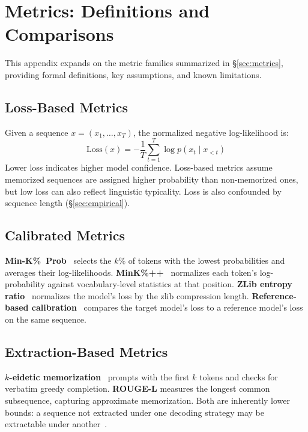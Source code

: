 \documentclass[11pt]{article}
\begin{document}
\section{Metrics: Definitions and Comparisons}
\label{app:metrics}

This appendix expands on the metric families summarized in \S\ref{sec:metrics},
providing formal definitions, key assumptions, and known limitations.

\subsection{Loss-Based Metrics}

Given a sequence $x = (x_1, \ldots, x_T)$, the normalized negative log-likelihood is:
\begin{equation}
\text{Loss}(x) = -\frac{1}{T} \sum_{t=1}^{T} \log p(x_t \mid x_{<t})
\end{equation}
Lower loss indicates higher model confidence.
Loss-based metrics assume memorized sequences are assigned higher probability
than non-memorized ones, but low loss can also reflect linguistic typicality.
Loss is also confounded by sequence length (\S\ref{sec:empirical}).

\subsection{Calibrated Metrics}

\textbf{Min-K\%~Prob}~\citep{shi2023detecting} selects the $k$\% of tokens
with the lowest probabilities and averages their log-likelihoods.
\textbf{MinK\%++}~\citep{zhang2025minkpp} normalizes each token's
log-probability against vocabulary-level statistics at that position.
\textbf{ZLib entropy ratio}~\citep{carlini2021extractingtrainingdatalarge}
normalizes the model's loss by the zlib compression length.
\textbf{Reference-based calibration}~\citep{carlini2022membership} compares
the target model's loss to a reference model's loss on the same sequence.

\subsection{Extraction-Based Metrics}

\textbf{$k$-eidetic memorization}~\citep{carlini2023quantifyingmemorizationneurallanguage}
prompts with the first $k$ tokens and checks for verbatim greedy completion.
\textbf{ROUGE-L} measures the longest common subsequence, capturing
approximate memorization.
Both are inherently lower bounds: a sequence not extracted under one decoding
strategy may be extractable under another~\citep{hayes2025measuringmemorizationlanguagemodels}.
\end{document}
